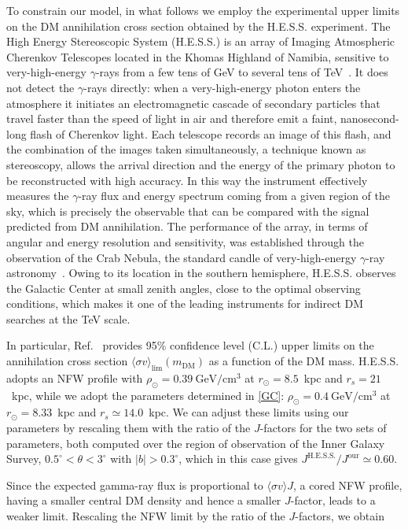 To constrain our model, in what follows we employ the experimental upper limits
on the DM annihilation cross section obtained by the H.E.S.S. experiment.
The High Energy Stereoscopic System (H.E.S.S.) is an array of Imaging
Atmospheric Cherenkov Telescopes located in the Khomas Highland of Namibia,
sensitive to very-high-energy $\gamma$-rays from a few tens of GeV to several
tens of TeV~\cite{Hinton2004}. 
It does not detect the $\gamma$-rays directly:
when a very-high-energy photon enters the atmosphere it initiates an
electromagnetic cascade of secondary particles that travel faster than the
speed of light in air and therefore emit a faint, nanosecond-long flash of
Cherenkov light. 
Each telescope records an image of this flash, and 
the combination of the images taken simultaneously, 
a technique known as stereoscopy,
allows the arrival direction and the energy 
of the primary photon to be reconstructed with high accuracy.
In this way the instrument effectively
measures the $\gamma$-ray flux and energy spectrum coming from a given region
of the sky, which is precisely the observable that can be compared with the
signal predicted from DM annihilation.
The performance of the array, in terms
of angular and energy resolution and sensitivity, was established through the
observation of the Crab Nebula, the standard candle of very-high-energy
$\gamma$-ray astronomy~\cite{Aharonian_2006_HESS}.
Owing to its location in the
southern hemisphere, H.E.S.S. observes the Galactic Center at small zenith
angles, close to the optimal observing conditions, which makes it one of the
leading instruments for indirect DM searches at the TeV scale.




In particular, Ref.~\cite{Abdalla_2022} provides 95\% confidence level (C.L.) upper limits on the annihilation cross section $\langle\sigma v\rangle_{\mathrm{lim}}(m_{\mathrm{DM}})$ as a function of the DM mass. 
H.E.S.S. adopts an NFW profile with $\rho_\odot = 0.39~\mathrm{GeV/cm^3}$ at $r_\odot = 8.5$~kpc and $r_s = 21$~kpc, while we adopt the parameters determined in \cref{GC}: $\rho_\odot = 0.4~\mathrm{GeV/cm^3}$ at $r_\odot = 8.33$~kpc and $r_s \simeq 14.0$~kpc.
We can adjust these limits using our parameters by rescaling them with the ratio of the $J$-factors for the two sets of parameters, 
both computed over the region of observation of the Inner Galaxy Survey,
$0.5^\circ < \theta < 3^\circ$ with $|b| > 0.3^\circ$, which in this case
gives $J^{\mathrm{H.E.S.S.}}/J^{\mathrm{our}} \simeq 0.60$.

Since the expected gamma-ray flux is proportional to
$\langle\sigma v\rangle J$, a cored NFW profile, having a smaller central DM
density and hence a smaller $J$-factor, leads to a weaker limit. Rescaling the
NFW limit by the ratio of the $J$-factors, we obtain


